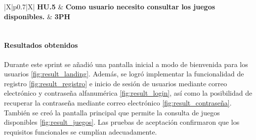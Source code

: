 \begin{table}[H]
\renewcommand{\arraystretch}{1.3}
\setlength{\tabcolsep}{10pt}
\vspace{0.8em}
\centering
\begin{tabularx}{\textwidth}{|X|p{}|X|}
    \hline
    \textbf{HU.5} & \textbf{Como usuario necesito consultar los juegos disponibles.} & \textbf{3PH} \\
    \hline
     \\
    \hline
\end{tabularx}
\caption{HU.5 - Consultar juegos disponibles - Desglose de tareas}
\vspace{0.8em}
\end{table}

\paragraph{Resultados obtenidos}
Durante este sprint se añadió una pantalla inicial a modo de bienvenida para los usuarios \cref{fig:result_landing}.
Además, se logró implementar la funcionalidad de registro \cref{fig:result_registro} e inicio de sesión de usuarios mediante correo electrónico y contraseña alfanumérica \cref{fig:result_login}, así como la posibilidad de recuperar la contraseña mediante correo electrónico \cref{fig:result_contraseña}.
También se creó la pantalla principal que permite la consulta de juegos disponibles \cref{fig:result_juegos}.
Las pruebas de aceptación confirmaron que los requisitos funcionales se cumplían adecuadamente.

